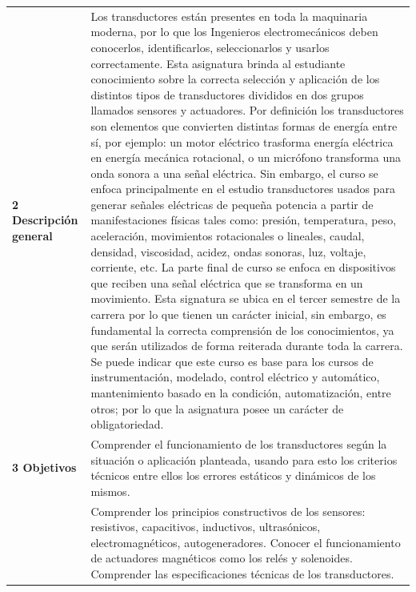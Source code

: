 \documentclass[letterpaper]{article}%
\begin{document}
\newpage%
\begin{longtable}{p{}p{}}%
\par\fontsize{12}{0}\selectfont \textbf{\textcolor{parte}{2 Descripción general}}&Los transductores están presentes en toda la maquinaria moderna, por lo que los Ingenieros electromecánicos deben conocerlos, identificarlos, seleccionarlos y usarlos correctamente.  Esta asignatura brinda al estudiante conocimiento sobre la correcta selección y aplicación de los distintos tipos de transductores divididos en dos grupos llamados sensores y actuadores.  Por definición los transductores son elementos que convierten distintas formas de energía entre sí, por ejemplo: un motor eléctrico trasforma energía eléctrica en energía mecánica rotacional, o un micrófono transforma una onda sonora a una señal eléctrica. Sin embargo, el curso se enfoca principalmente en el estudio transductores usados para generar señales eléctricas de pequeña potencia a partir de manifestaciones físicas tales como: presión, temperatura, peso, aceleración, movimientos rotacionales o lineales, caudal, densidad, viscosidad, acidez, ondas sonoras, luz, voltaje, corriente, etc. La parte final de curso se enfoca en dispositivos que reciben una señal eléctrica que se transforma en un movimiento.
\newline%
Esta signatura se ubica en el tercer semestre de la carrera por lo que tienen un carácter inicial, sin embargo, es fundamental la correcta comprensión de los conocimientos, ya que serán utilizados de forma reiterada durante toda la carrera. Se puede indicar que este curso es base para los cursos de instrumentación, modelado, control eléctrico y automático, mantenimiento basado en la condición, automatización, entre otros; por lo que la asignatura posee un carácter de obligatoriedad.\\%
\par\fontsize{12}{0}\selectfont \textbf{\textcolor{parte}{3 Objetivos}}&Comprender el funcionamiento de los transductores según la situación o aplicación planteada, usando para esto los criterios técnicos entre ellos los errores estáticos y dinámicos de los mismos.\\%
&Comprender los principios constructivos de los sensores: resistivos, capacitivos, inductivos, ultrasónicos, electromagnéticos, autogeneradores.
\newline%
Conocer el funcionamiento de actuadores magnéticos como los relés y solenoides.
\newline%
Comprender las especificaciones técnicas de los transductores.

\end{longtable}
\end{document}
